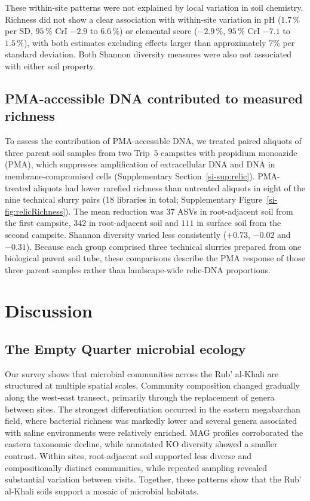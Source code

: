 \documentclass[fleqn,10pt,numbers]{olplainarticle}
\begin{document}
These within-site patterns were not explained by local variation in soil chemistry. Richness did not show a clear association with within-site variation in pH ($1.7\,\%$ per SD, $95\,\%$ CrI $-2.9$ to $6.6\,\%$) or elemental score ($-2.9\,\%$, $95\,\%$ CrI $-7.1$ to $1.5\,\%$), with both estimates excluding effects larger than approximately 7\% per standard deviation. Both Shannon diversity measures were also not associated with either soil property.

\subsection*{PMA-accessible DNA contributed to measured richness}

To assess the contribution of PMA-accessible DNA, we treated paired aliquots of three parent soil samples from two Trip~$5$ campsites with propidium monoazide (PMA), which suppresses amplification of extracellular DNA and DNA in membrane-compromised cells (Supplementary Section~\ref{si-sup:relic}). PMA-treated aliquots had lower rarefied richness than untreated aliquots in eight of the nine technical slurry pairs (18 libraries in total; Supplementary Figure~\ref{si-fig:relicRichness}). The mean reduction was $37$ ASVs in root-adjacent soil from the first campsite, $342$ in root-adjacent soil and $111$ in surface soil from the second campsite. Shannon diversity varied less consistently ($+0.73$, $-0.02$ and $-0.31$). Because each group comprised three technical slurries prepared from one biological parent soil tube, these comparisons describe the PMA response of those three parent samples rather than landscape-wide relic-DNA proportions.


\section*{Discussion}

\subsection*{The Empty Quarter microbial ecology}
Our survey shows that microbial communities across the Rub' al-Khali are structured at multiple spatial scales. Community composition changed gradually along the west-east transect, primarily through the replacement of genera between sites. The strongest differentiation occurred in the eastern megabarchan field, where bacterial richness was markedly lower and several genera associated with saline environments were relatively enriched. MAG profiles corroborated the eastern taxonomic decline, while annotated KO diversity showed a smaller contrast. Within sites, root-adjacent soil supported less diverse and compositionally distinct communities, while repeated sampling revealed substantial variation between visits. Together, these patterns show that the Rub' al-Khali soils support a mosaic of microbial habitats.
\end{document}
